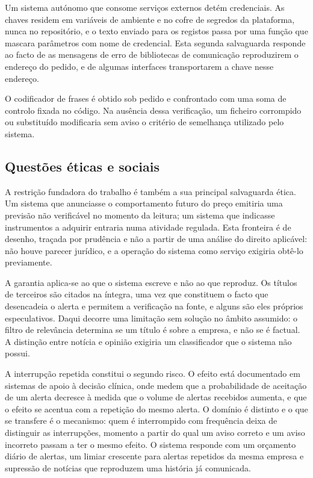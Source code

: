 Um sistema autónomo que consome serviços externos detém credenciais. As chaves residem em variáveis
de ambiente e no cofre de segredos da plataforma, nunca no repositório, e o texto enviado para os
registos passa por uma função que mascara parâmetros com nome de credencial. Esta segunda
salvaguarda responde ao facto de as mensagens de erro de bibliotecas de comunicação reproduzirem o
endereço do pedido, e de algumas interfaces transportarem a chave nesse endereço.

O codificador de frases é obtido sob pedido e confrontado com uma soma de controlo fixada no
código. Na ausência dessa verificação, um ficheiro corrompido ou substituído modificaria sem aviso
o critério de semelhança utilizado pelo sistema.

\subsection{Questões éticas e sociais}
\label{sec:met_etica}

A restrição fundadora do trabalho é também a sua principal salvaguarda ética. Um sistema que
anunciasse o comportamento futuro do preço emitiria uma previsão não verificável no momento da
leitura; um sistema que indicasse instrumentos a adquirir entraria numa atividade regulada. Esta
fronteira é de desenho, traçada por prudência e não a partir de uma análise do direito aplicável:
não houve parecer jurídico, e a operação do sistema como serviço exigiria obtê-lo previamente.

A garantia aplica-se ao que o sistema escreve e não ao que reproduz. Os títulos de terceiros são
citados na íntegra, uma vez que constituem o facto que desencadeia o alerta e permitem a
verificação na fonte, e alguns são eles próprios especulativos. Daqui decorre uma limitação sem
solução no âmbito assumido: o filtro de relevância determina se um título é sobre a empresa, e não
se é factual. A distinção entre notícia e opinião exigiria um classificador que o sistema não
possui.

A interrupção repetida constitui o segundo risco. O efeito está documentado em sistemas de apoio à
decisão clínica, onde \textcite{ancker2017alertfatigue} medem que a probabilidade de aceitação de um
alerta decresce à medida que o volume de alertas recebidos aumenta, e que o efeito se acentua com a
repetição do mesmo alerta. O domínio é distinto e o que se transfere é o mecanismo: quem é
interrompido com frequência deixa de distinguir as interrupções, momento a partir do qual um aviso
correto e um aviso incorreto passam a ter o mesmo efeito. O sistema responde com um orçamento
diário de alertas, um limiar crescente para alertas repetidos da mesma empresa e supressão de
notícias que reproduzem uma história já comunicada.

